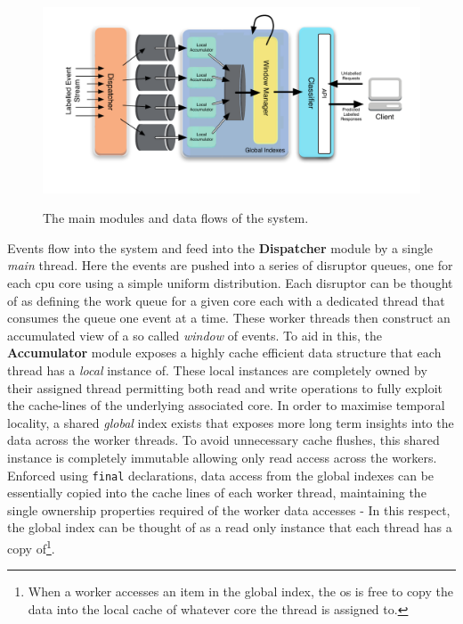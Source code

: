 \documentclass[a4paper,11pt]{scrreprt}
\begin{document}
\begin{figure}[h!]
\centering
\caption{The main modules and data flows of the system.}
\includegraphics[scale=0.72, trim=35 50 0 13, clip=true] {architectureoverview.pdf}
\label{fig:architectureoverview}
\end{figure}
Events flow into the system and feed into the \textbf{Dispatcher} module by a single \textit{main} thread. Here the events are pushed into a series of disruptor queues, one for each \acrshort{cpu} core using a simple uniform distribution. Each disruptor can be thought of as defining the work queue for a given core each with a dedicated thread that consumes the queue one event at a time. These worker threads then construct an accumulated view of a so called \textit{window} of events. To aid in this, the \textbf{Accumulator} module exposes a highly cache efficient data structure that each thread has a \textit{local} instance of. These local instances are completely owned by their assigned thread permitting both read and write operations to fully exploit the cache-lines of the underlying associated core. In order to maximise temporal locality, a shared \textit{global} index exists that exposes more long term insights into the data across the worker threads. To avoid unnecessary cache flushes, this shared instance is completely immutable allowing only read access across the workers. Enforced using \texttt{final} declarations, data access from the global indexes can be essentially copied into the cache lines of each worker thread, maintaining the single ownership properties required of the worker data accesses - In this respect, the global index can be thought of as a read only instance that each thread has a copy of\footnote{When a worker accesses an item in the global index, the \acrshort{os} is free to copy the data into the local cache of whatever core the thread is assigned to.}.
\end{document}
